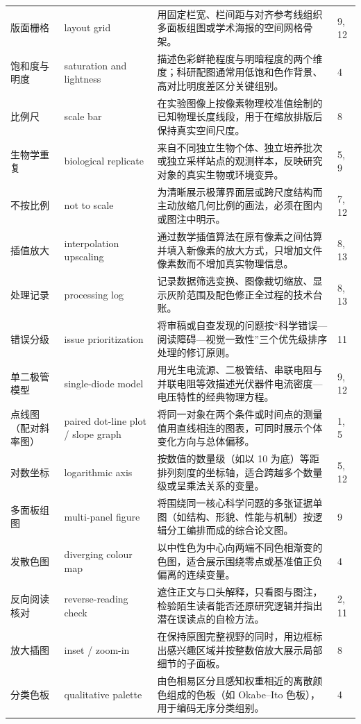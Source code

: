 \begin{longtable}{@{}p{26mm}p{32mm}p{54mm}p{8mm}@{}}
版面栅格 & layout grid & 用固定栏宽、栏间距与对齐参考线组织多面板组图或学术海报的空间网格骨架。 & 9, 12 \\
饱和度与明度 & saturation and lightness & 描述色彩鲜艳程度与明暗程度的两个维度；科研配图通常用低饱和色作背景、高对比明度差区分关键组别。 & 4 \\
比例尺 & scale bar & 在实验图像上按像素物理校准值绘制的已知物理长度线段，用于在缩放排版后保持真实空间尺度。 & 8 \\
生物学重复 & biological replicate & 来自不同独立生物个体、独立培养批次或独立采样站点的观测样本，反映研究对象的真实生物或环境变异。 & 5, 9 \\
不按比例 & not to scale & 为清晰展示极薄界面层或跨尺度结构而主动放缩几何比例的画法，必须在图内或图注中明示。 & 7, 12 \\
插值放大 & interpolation upscaling & 通过数学插值算法在原有像素之间估算并填入新像素的放大方式，只增加文件像素数而不增加真实物理信息。 & 8, 13 \\
处理记录 & processing log & 记录数据筛选变换、图像裁切缩放、显示灰阶范围及配色修正全过程的技术台账。 & 8, 13 \\
错误分级 & issue prioritization & 将审稿或自查发现的问题按“科学错误—阅读障碍—视觉一致性”三个优先级排序处理的修订原则。 & 11 \\
单二极管模型 & single-diode model & 用光生电流源、二极管结、串联电阻与并联电阻等效描述光伏器件电流密度—电压特性的经典物理方程。 & 9, 12 \\
点线图（配对斜率图） & paired dot-line plot / slope graph & 将同一对象在两个条件或时间点的测量值用直线相连的图表，可同时展示个体变化方向与总体偏移。 & 1, 5 \\
对数坐标 & logarithmic axis & 按数值的数量级（如以 10 为底）等距排列刻度的坐标轴，适合跨越多个数量级或呈乘法关系的变量。 & 5, 12 \\
多面板组图 & multi-panel figure & 将围绕同一核心科学问题的多张证据单图（如结构、形貌、性能与机制）按逻辑分工编排而成的综合论文图。 & 9 \\
发散色图 & diverging colour map & 以中性色为中心向两端不同色相渐变的色图，适合展示围绕零点或基准值正负偏离的连续变量。 & 4 \\
反向阅读核对 & reverse-reading check & 遮住正文与口头解释，只看图与图注，检验陌生读者能否还原研究逻辑并指出潜在误读点的自检方法。 & 2, 11 \\
放大插图 & inset / zoom-in & 在保持原图完整视野的同时，用边框标出感兴趣区域并按整数倍放大展示局部细节的子面板。 & 8 \\
分类色板 & qualitative palette & 由色相易区分且感知权重相近的离散颜色组成的色板（如 Okabe--Ito 色板），用于编码无序分类组别。 & 4 \\

\end{longtable}
